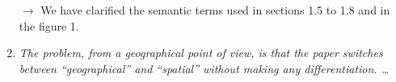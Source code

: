 \documentclass[11pt,a4paper,sans]{moderncv}        %
\begin{document}
\begin{enumerate}
   $\rightarrow$ We have clarified the semantic terms used in sections 1.5 to 1.8 and in the figure 1.
   
 

\medskip

  \item \textit{The problem, from a geographical point of view, is that the paper switches between “geographical” and “spatial” without making any differentiation. \ldots}
  

\end{enumerate}
\end{document}
